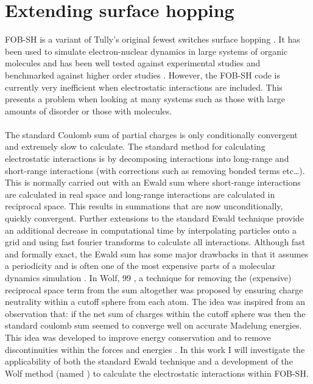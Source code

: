 \chapter{Extending surface hopping}
\label{chap:surface_hopping_ES}

\noindent FOB-SH is a variant of Tully's original fewest switches surface hopping \cite{FSSH_orig}. It has been used to simulate electron-nuclear dynamics in large systems of organic molecules and has been well tested against experimental studies and benchmarked against higher order studies \cite{FlickPolarons, Giannini2018Crossover, Giannini2019,             C9TC05270D, Carof2017FSSH, C9FD00046A, C9CP04770K, FOB-SH_Spencer,        C6FD00107F}. However, the FOB-SH code is currently very inefficient when electrostatic interactions are included. This presents a problem when looking at many systems\replace{;}{,} such as those with large amounts of disorder or those with  molecules. 
\\\\
The standard Coulomb sum of partial charges is only conditionally convergent and extremely slow to calculate. The standard method for calculating electrostatic interactions is by decomposing interactions into long-range and short-range interactions (with corrections such as removing bonded terms etc\ldots). This is normally carried out with an Ewald sum \cite{Ewald} where  short-range interactions are calculated in real space and long-range interactions are calculated in reciprocal space. This results in  summations that are now unconditionally, quickly convergent. Further extensions to the standard Ewald technique provide an additional decrease in computational time by interpolating particles onto a grid and using fast fourier transforms to calculate all interactions. Although fast and formally exact, the Ewald sum has some major drawbacks in that it assumes a  periodicity and is often one of the most expensive parts of a molecular dynamics simulation \cite{EwaldReview}. In Wolf, 99 \cite{Wolf99}, a technique for removing the (expensive) reciprocal space term from the sum altogether was proposed by ensuring charge neutrality within a cutoff sphere from each atom. The idea was inspired from an observation that: if the net sum of charges within the cutoff sphere was  then the standard coulomb sum seemed to converge well on accurate Madelung energies. This idea was developed to improve energy conservation and to remove discontinuities within the forces and energies \cite{Zahn2002, DSF}. In this work I will investigate the applicability of both the standard Ewald technique and a development of the Wolf method (named  \cite{DSF}) to calculate the electrostatic interactions within FOB-SH.
